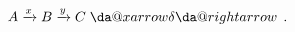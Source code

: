 \documentclass[preview]{standalone}
\makeatletter
\newcommand*{\xdashrightarrow}[2][]{\mathrel{\mathpalette{\da@xarrow{#1}{#2}{}\da@rightarrow{\,}{}}{}}}
\makeatother
\begin{document}
\begin{center}
$A\xrightarrow{x}B\xrightarrow{y}C\xdashrightarrow{\delta}.$
\end{center}
\end{document}
